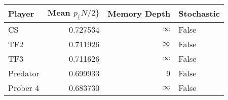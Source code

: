 \begin{tabular}{lrrl}
\toprule
   Player &  Mean $p_\{N/2\}$ &  Memory Depth & Stochastic \\
\midrule
       CS &        0.727534 &            \(\infty\) &      False \\
      TF2 &        0.711926 &            \(\infty\) &      False \\
      TF3 &        0.711626 &            \(\infty\) &      False \\
 Predator &        0.699933 &             9 &      False \\
 Prober 4 &        0.683730 &            \(\infty\) &      False \\
\bottomrule
\end{tabular}
